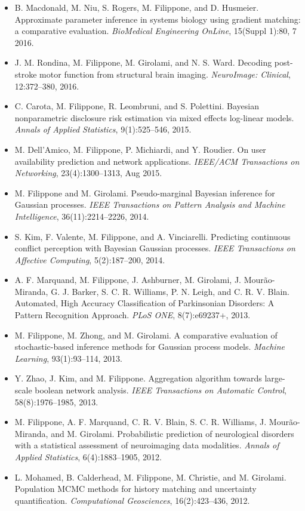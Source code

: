 \begin{itemize}
\item  B. Macdonald, M. Niu, S. Rogers, M. Filippone, and D. Husmeier. Approximate parameter inference in systems biology using gradient matching: a comparative evaluation. \emph{BioMedical Engineering OnLine}, 15(Suppl 1):80, 7 2016.  
\item  J. M. Rondina, M. Filippone, M. Girolami, and N. S. Ward. Decoding post-stroke motor function from structural brain imaging. \emph{NeuroImage: Clinical}, 12:372--380, 2016.  
\item  C. Carota, M. Filippone, R. Leombruni, and S. Polettini. Bayesian nonparametric disclosure risk estimation via mixed effects log-linear models. \emph{Annals of Applied Statistics}, 9(1):525--546, 2015.  
\item  M. Dell'Amico, M. Filippone, P. Michiardi, and Y. Roudier. On user availability prediction and network applications. \emph{IEEE/ACM Transactions on Networking}, 23(4):1300--1313, Aug 2015.  
\item  M. Filippone and M. Girolami. Pseudo-marginal Bayesian inference for Gaussian processes. \emph{IEEE Transactions on Pattern Analysis and Machine Intelligence}, 36(11):2214--2226, 2014.  
\item  S. Kim, F. Valente, M. Filippone, and A. Vinciarelli. Predicting continuous conflict perception with Bayesian Gaussian processes. \emph{IEEE Transactions on Affective Computing}, 5(2):187--200, 2014.  
\item  A. F. Marquand, M. Filippone, J. Ashburner, M. Girolami, J. Mour\~ao-Miranda, G. J. Barker, S. C. R. Williams, P. N. Leigh, and C. R. V. Blain. Automated, High Accuracy Classification of Parkinsonian Disorders: A Pattern Recognition Approach. \emph{PLoS ONE}, 8(7):e69237+, 2013.  
\item  M. Filippone, M. Zhong, and M. Girolami. A comparative evaluation of stochastic-based inference methods for Gaussian process models. \emph{Machine Learning}, 93(1):93--114, 2013.  
\item  Y. Zhao, J. Kim, and M. Filippone. Aggregation algorithm towards large-scale boolean network analysis. \emph{IEEE Transactions on Automatic Control}, 58(8):1976--1985, 2013.  
\item  M. Filippone, A. F. Marquand, C. R. V. Blain, S. C. R. Williams, J. Mour\~ao-Miranda, and M. Girolami. Probabilistic prediction of neurological disorders with a statistical assessment of neuroimaging data modalities. \emph{Annals of Applied Statistics}, 6(4):1883--1905, 2012.  
\item  L. Mohamed, B. Calderhead, M. Filippone, M. Christie, and M. Girolami. Population MCMC methods for history matching and uncertainty quantification. \emph{Computational Geosciences}, 16(2):423--436, 2012.  

\end{itemize}
